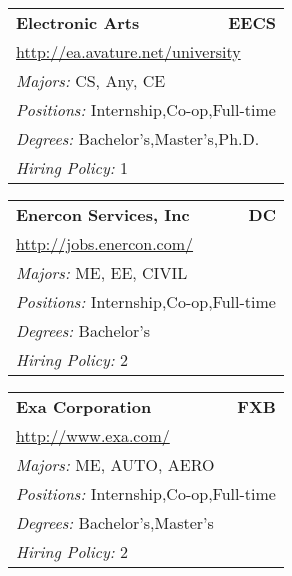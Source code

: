 \documentclass[twoside]{article}
\begin{document}
\begin{center}
\begin{multicols}{3}
\begin{FlushLeft}
\begin{minipage}{.9\columnwidth}
\end{minipage}
 
\begin{minipage}{.9\columnwidth}\begin{tabularx}{.95\columnwidth}{Xr}
                 {\Large\bf Electronic Arts} & {\Large\bf EECS}\\
    \multicolumn{2}{p{.95\columnwidth}}{\url{http://ea.avature.net/university}}\\
    \multicolumn{2}{p{.95\columnwidth}}{\emph{Majors:} CS, Any, CE}\\
    \multicolumn{2}{p{.95\columnwidth}}{\emph{Positions:} Internship,Co-op,Full-time}\\
    \multicolumn{2}{p{.95\columnwidth}}{\emph{Degrees:} Bachelor's,Master's,Ph.D.}\\
    \multicolumn{2}{p{.95\columnwidth}}{\emph{Hiring Policy:} 1}\\
    \end{tabularx}
    
\end{minipage}
 
\begin{minipage}{.9\columnwidth}\begin{tabularx}{.95\columnwidth}{Xr}
                 {\Large\bf Enercon Services, Inc} & {\Large\bf DC}\\
    \multicolumn{2}{p{.95\columnwidth}}{\url{http://jobs.enercon.com/}}\\
    \multicolumn{2}{p{.95\columnwidth}}{\emph{Majors:} ME, EE, CIVIL}\\
    \multicolumn{2}{p{.95\columnwidth}}{\emph{Positions:} Internship,Co-op,Full-time}\\
    \multicolumn{2}{p{.95\columnwidth}}{\emph{Degrees:} Bachelor's}\\
    \multicolumn{2}{p{.95\columnwidth}}{\emph{Hiring Policy:} 2}\\
    \end{tabularx}
    
\end{minipage}
 
\begin{minipage}{.9\columnwidth}\begin{tabularx}{.95\columnwidth}{Xr}
                 {\Large\bf Exa Corporation} & {\Large\bf FXB}\\
    \multicolumn{2}{p{.95\columnwidth}}{\url{http://www.exa.com/}}\\
    \multicolumn{2}{p{.95\columnwidth}}{\emph{Majors:} ME, AUTO, AERO}\\
    \multicolumn{2}{p{.95\columnwidth}}{\emph{Positions:} Internship,Co-op,Full-time}\\
    \multicolumn{2}{p{.95\columnwidth}}{\emph{Degrees:} Bachelor's,Master's}\\
    \multicolumn{2}{p{.95\columnwidth}}{\emph{Hiring Policy:} 2}\\
    \end{tabularx}
    

\end{minipage}
\end{FlushLeft}
\end{multicols}
\end{center}
\end{document}
